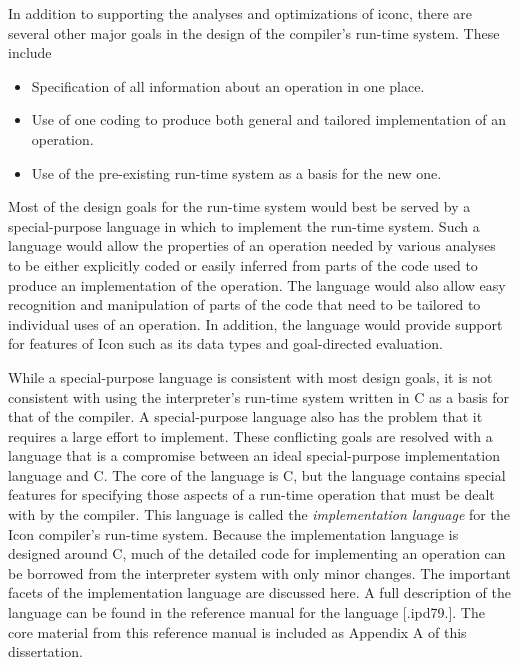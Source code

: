 In addition to supporting the analyses and optimizations of iconc,
there are several other major goals in the design of the compiler's
run-time system. These include

\liststyleLxx
\begin{itemize}

\item Specification of all information about an operation in one place. 

\item Use of one coding to produce both general and tailored
implementation of an operation.

\item Use of the pre-existing run-time system as a basis for the new one. 

\end{itemize}

Most of the design goals for the run-time system would best be served
by a special-purpose language in which to implement the run-time
system. Such a language would allow the properties of an operation
needed by various analyses to be either explicitly coded or easily
inferred from parts of the code used to produce an implementation of
the operation. The language would also allow easy recognition and
manipulation of parts of the code that need to be tailored to
individual uses of an operation. In addition, the language would
provide support for features of Icon such as its data types and
goal-directed evaluation.

While a special-purpose language is consistent with most design goals,
it is not consistent with using the interpreter's run-time system
written in C as a basis for that of the compiler. A special-purpose
language also has the problem that it requires a large effort to
implement. These conflicting goals are resolved with a language that
is a compromise between an ideal special-purpose implementation
language and C. The core of the language is C, but the language
contains special features for specifying those aspects of a run-time
operation that must be dealt with by the compiler.  This language is
called the \textit{implementation language} for the Icon compiler's
run-time system. Because the implementation language is designed
around C, much of the detailed code for implementing an operation can
be borrowed from the interpreter system with only minor changes. The
important facets of the implementation language are discussed here. A
full description of the language can be found in the reference manual
for the language [.ipd79.]. The core material from this reference
manual is included as Appendix A of this dissertation.


